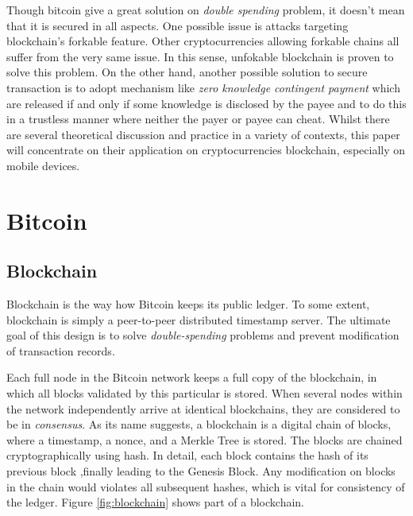 \documentclass[12pt]{article}
\begin{document}
Though bitcoin give a great solution on \textit{double spending} problem, it doesn't mean that it is secured in all aspects. One possible issue is attacks targeting blockchain's forkable feature. Other cryptocurrencies allowing forkable chains all suffer from the very same issue. In this sense, unfokable blockchain is proven to solve this problem\cite{DBLP:journals/corr/CrainGLR17}. On the other hand, another possible solution to secure transaction is to adopt mechanism like \textit{zero knowledge contingent payment} which are released if and only if some knowledge is disclosed by the payee and to do this in a trustless manner where neither the payer or payee can cheat\cite{wiki2011zero}\cite{sasson2014zerocash}. Whilst there are several theoretical discussion and practice in a variety of contexts, this paper will concentrate on their application on cryptocurrencies blockchain, especially on mobile devices. 

\section{Bitcoin}
\label{sec:Blockchain}

\subsection{Blockchain}

Blockchain is the way how Bitcoin keeps its public ledger. To some extent, blockchain is simply a peer-to-peer distributed timestamp server. The ultimate goal of this design is to solve \textit{double-spending} problems and prevent modification of transaction records\cite{nakamoto2008bitcoin}. 

Each full node in the Bitcoin network keeps a full copy of the blockchain, in which all blocks validated by this particular is stored. When several nodes within the network independently arrive at identical blockchains, they are considered to be in \textit{consensus}. As its name suggests, a blockchain is a digital chain of blocks, where a timestamp, a nonce, and a Merkle Tree is stored.  The blocks are chained cryptographically using hash. In detail, each block contains the hash of its previous block ,finally leading to the Genesis Block. Any modification on blocks in the chain would violates all subsequent hashes, which is vital for consistency of the ledger. Figure \ref{fig:blockchain} shows part of a blockchain. 
\end{document}
